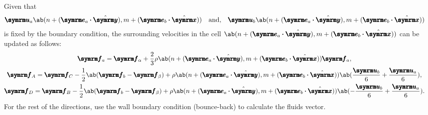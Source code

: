 Given that
\begin{equation}
	\vv{u}_a\ab(n + (\vv{e}_a\vdot\yhat), m + (\vv{e}_b\vdot\xhat)) \mathand \vv{u}_b\ab(n + (\vv{e}_a\vdot\yhat), m + (\vv{e}_b\vdot\xhat))
\end{equation}
is fixed by the boundary condition, the surrounding velocities in the cell $\ab(n + (\vv{e}_a\vdot\yhat), m + (\vv{e}_b\vdot\xhat))$ can be updated as follows: \cite{zou-1997}
\begin{gather}
	\vv{f}_a = \vv{f}_{\alpha} + \frac{2}{3}\rho\ab(n + (\vv{e}_a\vdot\yhat), m + (\vv{e}_b\vdot\xhat))\vv{f}_a, \\
	\vv{f}_A = \vv{f}_{C} - \frac{1}{2}\ab(\vv{f}_b - \vv{f}_{\beta}) + \rho\ab(n + (\vv{e}_a\vdot\yhat), m + (\vv{e}_b\vdot\xhat))\ab(\frac{\vv{u}_b}{6} + \frac{\vv{u}_a}{6}), \\
	\vv{f}_D = \vv{f}_{B} - \frac{1}{2}\ab(\vv{f}_b - \vv{f}_{\beta}) + \rho\ab(n + (\vv{e}_a\vdot\yhat), m + (\vv{e}_b\vdot\xhat))\ab(- \frac{\vv{u}_b}{6} + \frac{\vv{u}_a}{6}).
\end{gather}
For the rest of the directions, use the wall boundary condition (bounce-back) to calculate the fluids vector.

